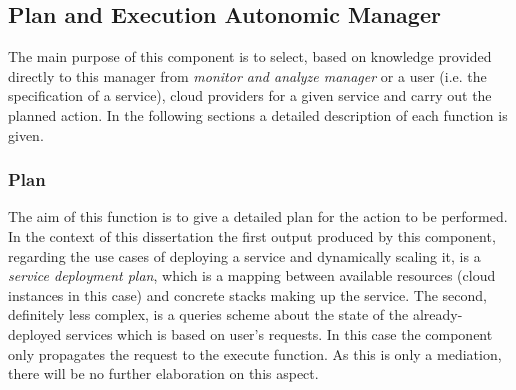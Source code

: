 \subsection{Plan and Execution Autonomic Manager}
The main purpose of this component is to select, based on knowledge provided directly to this manager from \emph{monitor and analyze manager} or a user (i.e. the specification of a service), cloud providers for a given service and carry out the planned action. In the following sections a detailed description of each function is given.

\subsubsection{Plan}
The aim of this function is to give a detailed plan for the action to be performed. In the context of this dissertation the first output produced by this component, regarding the use cases of deploying a service and dynamically scaling it, is a \emph{service deployment plan}, which is a mapping between available resources (cloud instances in this case) and concrete stacks making up the service. The second, definitely less complex, is a queries scheme about the state of the already-deployed services which is based on user's requests. In this case the component only propagates the request to the execute function. As this is only a mediation, there will be no further elaboration on this aspect.

